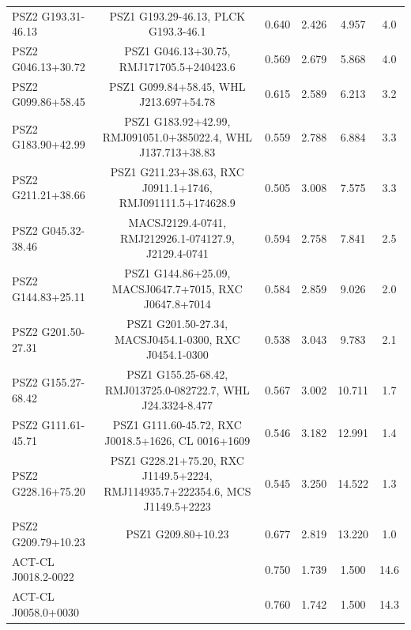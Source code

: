 \documentclass[11pt,a4paper,twoside,graphicx,color]{article}
\begin{document}
\begin{table}
{\begin{tabular}{|l  || c | c | c | c | c | }
  PSZ2 G193.31-46.13    &    PSZ1 G193.29-46.13, PLCK G193.3-46.1          &         0.640   &  2.426  &   4.957  &   4.0 \\%
  PSZ2 G046.13+30.72   &     PSZ1 G046.13+30.75, RMJ171705.5+240423.6        &     0.569  &   2.679  &   5.868  &   4.0  \\%
  PSZ2 G099.86+58.45   &     PSZ1 G099.84+58.45, WHL J213.697+54.78             &     0.615  &   2.589  &   6.213  &   3.2  \\%
  \hline
  PSZ2 G183.90+42.99   &     PSZ1 G183.92+42.99, RMJ091051.0+385022.4, WHL J137.713+38.83   &     0.559  &   2.788   &  6.884  &   3.3  \\%
  PSZ2 G211.21+38.66   &     PSZ1 G211.23+38.63, RXC J0911.1+1746, RMJ091111.5+174628.9	&         0.505  &   3.008   &  7.575  &   3.3  \\%
  PSZ2 G045.32-38.46   &     MACSJ2129.4-0741, RMJ212926.1-074127.9, J2129.4-0741                &          0.594  &   2.758   &  7.841  &   2.5  \\%
  PSZ2 G144.83+25.11  &      PSZ1 G144.86+25.09, MACSJ0647.7+7015, RXC J0647.8+7014         &          0.584  &   2.859  &   9.026  &   2.0  \\%
  PSZ2 G201.50-27.31   &     PSZ1 G201.50-27.34, MACSJ0454.1-0300, RXC J0454.1-0300             &          0.538  &   3.043  &   9.783  &   2.1 \\%
  \hline
  PSZ2 G155.27-68.42   &     PSZ1 G155.25-68.42, RMJ013725.0-082722.7, WHL J24.3324-8.477    &          0.567  &   3.002  &  10.711  &   1.7  \\%
  PSZ2 G111.61-45.71    &    PSZ1 G111.60-45.72, RXC J0018.5+1626, CL 0016+1609                      &          0.546  &   3.182  &  12.991  &   1.4  \\%
  PSZ2 G228.16+75.20   &     PSZ1 G228.21+75.20, RXC J1149.5+2224, RMJ114935.7+222354.6, MCS J1149.5+2223   &   0.545  &   3.250  &  14.522  &   1.3   \\%
  PSZ2 G209.79+10.23    &    PSZ1 G209.80+10.23                                         &   0.677  &   2.819  &  13.220   &  1.0   \\%
  \hline
  \hline
  ACT-CL J0018.2-0022    &                                                                               &      0.750   &  1.739   &  1.500  &   14.6  \\%
  ACT-CL J0058.0+0030   &                                                                               &      0.760   &  1.742  &   1.500  &   14.3  \\%

\end{tabular}}
\end{table}
\end{document}
